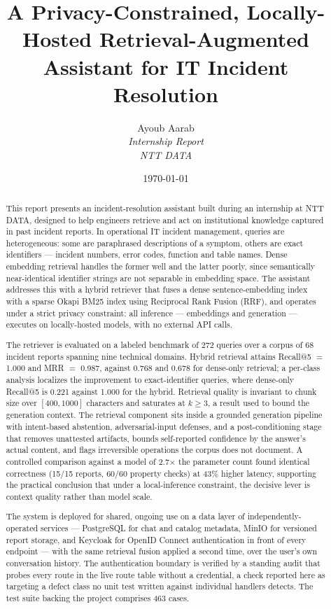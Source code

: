 \documentclass[12pt, a4paper]{article}
\title{\textbf{A Privacy-Constrained, Locally-Hosted Retrieval-Augmented\\Assistant for IT Incident Resolution}}
\author{Ayoub Aarab\\
\textit{Internship Report}\\
\textit{NTT DATA}}
\date{\today}
\begin{document}
\maketitle

\begin{abstract}
This report presents an incident-resolution assistant built during an internship at NTT DATA, designed to help engineers retrieve and act on institutional knowledge captured in past incident reports. In operational IT incident management, queries are heterogeneous: some are paraphrased descriptions of a symptom, others are exact identifiers — incident numbers, error codes, function and table names. Dense embedding retrieval handles the former well and the latter poorly, since semantically near-identical identifier strings are not separable in embedding space. The assistant addresses this with a hybrid retriever that fuses a dense sentence-embedding index with a sparse Okapi BM25 index using Reciprocal Rank Fusion (RRF), and operates under a strict privacy constraint: all inference — embeddings and generation — executes on locally-hosted models, with no external API calls.

The retriever is evaluated on a labeled benchmark of 272 queries over a corpus of 68 incident reports spanning nine technical domains. Hybrid retrieval attains Recall@5 $=$ 1.000 and MRR $=$ 0.987, against 0.768 and 0.678 for dense-only retrieval; a per-class analysis localizes the improvement to exact-identifier queries, where dense-only Recall@5 is 0.221 against 1.000 for the hybrid. Retrieval quality is invariant to chunk size over $[400, 1000]$ characters and saturates at $k \geq 3$, a result used to bound the generation context. The retrieval component sits inside a grounded generation pipeline with intent-based abstention, adversarial-input defenses, and a post-conditioning stage that removes unattested artifacts, bounds self-reported confidence by the answer's actual content, and flags irreversible operations the corpus does not document. A controlled comparison against a model of 2.7$\times$ the parameter count found identical correctness (15/15 reports, 60/60 property checks) at 43\% higher latency, supporting the practical conclusion that under a local-inference constraint, the decisive lever is context quality rather than model scale.

The system is deployed for shared, ongoing use on a data layer of independently-operated services --- PostgreSQL for chat and catalog metadata, MinIO for versioned report storage, and Keycloak for OpenID Connect authentication in front of every endpoint --- with the same retrieval fusion applied a second time, over the user's own conversation history. The authentication boundary is verified by a standing audit that probes every route in the live route table without a credential, a check reported here as targeting a defect class no unit test written against individual handlers detects. The test suite backing the project comprises 463 cases.
\end{abstract}
\end{document}
